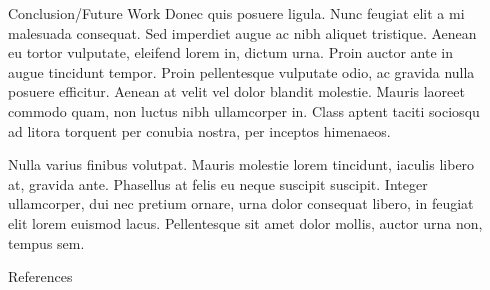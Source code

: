 \documentclass[final]{beamer}
\newlength{\sepwidth}
\newlength{\colwidth}
\newcommand{\separatorcolumn}{\begin{column}{\sepwidth}\end{column}}
\begin{document}
\begin{frame}[t]
\begin{columns}[t]
\begin{column}{\colwidth}
\begin{block}{Conclusion/Future Work}
    Donec quis posuere ligula. Nunc feugiat elit a mi malesuada consequat. Sed
    imperdiet augue ac nibh aliquet tristique. Aenean eu tortor vulputate,
    eleifend lorem in, dictum urna. Proin auctor ante in augue tincidunt
    tempor. Proin pellentesque vulputate odio, ac gravida nulla posuere
    efficitur. Aenean at velit vel dolor blandit molestie. Mauris laoreet
    commodo quam, non luctus nibh ullamcorper in. Class aptent taciti sociosqu
    ad litora torquent per conubia nostra, per inceptos himenaeos.

    Nulla varius finibus volutpat. Mauris molestie lorem tincidunt, iaculis
    libero at, gravida ante. Phasellus at felis eu neque suscipit suscipit.
    Integer ullamcorper, dui nec pretium ornare, urna dolor consequat libero,
    in feugiat elit lorem euismod lacus. Pellentesque sit amet dolor mollis,
    auctor urna non, tempus sem.

  \end{block}

  \begin{block}{References}

    \nocite{*}
    \footnotesize{}

  \end{block}

\end{column}

\separatorcolumn
\end{columns}
\end{frame}
\end{document}
